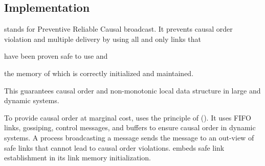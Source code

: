 
  

\subsection{Implementation}

\RPCBROADCAST stands for Preventive Reliable Causal broadcast. It prevents
causal order violation and multiple delivery by using all and only links that
\begin{inparaenum}[(i)]
\item have been proven safe to use and
\item the memory of which is correctly initialized and maintained.
\end{inparaenum}
This guarantees causal order and non-monotonic local data structure in large and
dynamic systems. 


To provide causal order at marginal cost, \RPCBROADCAST uses the principle of
\PCBROADCAST (\REF). It uses FIFO links, gossiping, control messages, and
buffers to ensure causal order in dynamic systems. A process broadcasting a
message sends the message to an out-view of safe links that cannot lead to
causal order violations. \RPCBROADCAST embeds safe link establishment in its
link memory initialization.

